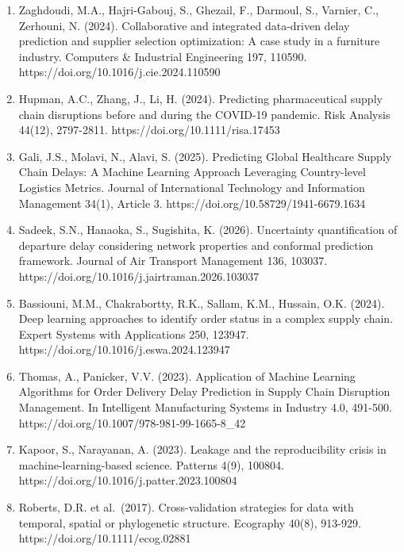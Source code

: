 \documentclass[
]{article}
\begin{document}
\begin{enumerate}
  Liang, X., Fan, S., Li, H., Goerlandt, F., Yang, Z. (2026). Freeports
  under the lens: securing container supply chains with a risk-based
  inspection framework. Transportation Research Part E 208, 104658.
  https://doi.org/10.1016/j.tre.2025.104658
\item
  Zaghdoudi, M.A., Hajri-Gabouj, S., Ghezail, F., Darmoul, S., Varnier,
  C., Zerhouni, N. (2024). Collaborative and integrated data-driven
  delay prediction and supplier selection optimization: A case study in
  a furniture industry. Computers \& Industrial Engineering 197, 110590.
  https://doi.org/10.1016/j.cie.2024.110590
\item
  Hupman, A.C., Zhang, J., Li, H. (2024). Predicting pharmaceutical
  supply chain disruptions before and during the COVID-19 pandemic. Risk
  Analysis 44(12), 2797-2811. https://doi.org/10.1111/risa.17453
\item
  Gali, J.S., Molavi, N., Alavi, S. (2025). Predicting Global Healthcare
  Supply Chain Delays: A Machine Learning Approach Leveraging
  Country-level Logistics Metrics. Journal of International Technology
  and Information Management 34(1), Article 3.
  https://doi.org/10.58729/1941-6679.1634
\item
  Sadeek, S.N., Hanaoka, S., Sugishita, K. (2026). Uncertainty
  quantification of departure delay considering network properties and
  conformal prediction framework. Journal of Air Transport Management
  136, 103037. https://doi.org/10.1016/j.jairtraman.2026.103037
\item
  Bassiouni, M.M., Chakrabortty, R.K., Sallam, K.M., Hussain, O.K.
  (2024). Deep learning approaches to identify order status in a complex
  supply chain. Expert Systems with Applications 250, 123947.
  https://doi.org/10.1016/j.eswa.2024.123947
\item
  Thomas, A., Panicker, V.V. (2023). Application of Machine Learning
  Algorithms for Order Delivery Delay Prediction in Supply Chain
  Disruption Management. In Intelligent Manufacturing Systems in
  Industry 4.0, 491-500. https://doi.org/10.1007/978-981-99-1665-8\_42
\item
  Kapoor, S., Narayanan, A. (2023). Leakage and the reproducibility
  crisis in machine-learning-based science. Patterns 4(9), 100804.
  https://doi.org/10.1016/j.patter.2023.100804
\item
  Roberts, D.R. et al.~(2017). Cross-validation strategies for data with
  temporal, spatial or phylogenetic structure. Ecography 40(8), 913-929.
  https://doi.org/10.1111/ecog.02881

\end{enumerate}
\end{document}
